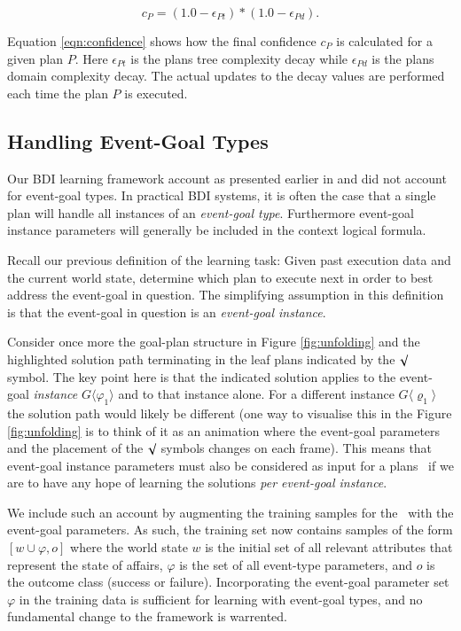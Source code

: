 \begin{equation}\label{eqn:confidence}   
c_P = (1.0 - \epsilon_{Pt}) * (1.0 - \epsilon_{Pd}).
\end{equation}

Equation \ref{eqn:confidence} shows how the final confidence $c_P$ is calculated for a given plan $P$. Here $\epsilon_{Pt}$ is the plans tree complexity decay while $\epsilon_{Pd}$ is the plans domain complexity decay. The actual updates to the decay values are performed each time the plan $P$ is executed. 

\subsection{Handling Event-Goal Types}

Our BDI learning framework account as presented earlier in \cite{Airiau:IJAT:09} and \cite{Singh:AAMAS10} did not account for event-goal types. In practical BDI systems, it is often the case that a single plan will handle all instances of an \textit{event-goal type}. Furthermore event-goal instance parameters will generally be included in the context logical formula. 

Recall our previous definition of the learning task: Given past execution data and the current world state, determine which plan to execute next in order to best address the event-goal in question. The simplifying assumption in this definition is that the event-goal in question is an \textit{event-goal instance}. 

Consider once more the goal-plan structure in Figure \ref{fig:unfolding} and the highlighted solution path terminating in the leaf plans indicated by the $\surd$ symbol. The key point here is that the indicated solution applies to the event-goal \textit{instance} $G\langle\varphi_1\rangle$ and to that instance alone. For a different instance $G\langle\varrho_1\rangle$ the solution path would likely be different (one way to visualise this in the Figure \ref{fig:unfolding} is to think of it as an animation where the event-goal parameters and the placement of the $\surd$ symbols changes on each frame).  This means that event-goal instance parameters must also be considered as input for a plans \dt\, if we are to have any hope of learning the solutions \textit{per event-goal instance}.

We include such an account by augmenting the training samples for the \dt\ with the event-goal parameters. As such, the training set now contains samples of the form $[w \cup \varphi,o]$ where the world state $w$ is the initial set of all relevant attributes that represent the state of affairs, $\varphi$ is the set of all event-type parameters, and $o$ is the outcome class (success or failure). Incorporating the event-goal parameter set $\varphi$ in the training data is sufficient for learning with event-goal types, and no fundamental change to the framework is warrented.


